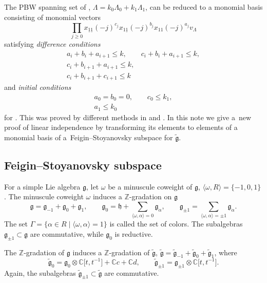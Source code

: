 \documentclass[pdftex]{sigma}
\newcommand{\Z}
{{\mathbb Z}}
\newcommand{\g}
{{\mathfrak g}}
\newcommand{\gt}
{\tilde{{\mathfrak g}}}
\numberwithin{equation}{section}
\begin{document}
The PBW spanning set of ,
$\Lambda = k_0 \Lambda_0 + k_1 \Lambda_1$,
 can be reduced to a monomial basis consisting of monomial vectors
\begin{equation} \label{upi}
	\prod_{j\geq 0} x_{\underline{1}\underline{1}}(-j)^{c_j} x_{1 \underline{1}}(-j)^{b_j} x_{11} (-j)^{a_j} v_\Lambda
\end{equation}
satisfying {\em difference conditions}
\begin{gather}
	\label{DCA1} 	
	a_i +b_i+a_{i+1}\leq k ,	\qquad
	c_i +b_i+a_{i+1}\leq k 	,\\
	\label{DCA1.5} c_i +b_{i+1}+a_{i+1}\leq k ,	\\
	\label{DCA2}	c_i +b_{i+1}+c_{i+1}\leq k 	
\end{gather}
and {\em initial conditions}
\begin{gather}
a_0=b_0  = 0,\qquad
	c_0 \leq k_1	,\label{ICA1} \\
a_1 \leq k_0	\label{ICA2}
\end{gather}
for .
%
 This was proved by different methods in \cite{MP} and \cite{FKLMM}. In this note we give a~new proof of linear independence by transforming its elements to elements of a monomial basis of a~Feigin--Stoyanovsky subspace for $\gt$.




\subsection{Feigin--Stoyanovsky subspace}

For a simple Lie algebra $\g$, let $\omega$ be a minuscule coweight of $\g$, $\langle \omega, R\rangle = \{-1,0,1\}$. The minuscule coweight $\omega$ induces a $\Z$-gradation on $\g$
\[
\mathfrak g =\mathfrak g_{-1} + \mathfrak g_0 + \mathfrak g_1 , \qquad
{\mathfrak g}_0 = {\mathfrak h} +
\sum_{\langle\omega,\alpha\rangle=0}  {\mathfrak g}_\alpha,
\qquad
\displaystyle {\mathfrak g}_{\pm1} =
\sum_{\langle\omega,\alpha\rangle= \pm 1}  {\mathfrak g}_\alpha.
\]
The set
$
	\Gamma =
	\{ \alpha \in R \mid \langle\omega,\alpha\rangle = 1\}
$
is called the set of colors.
The subalgebras ${\mathfrak g}_{\pm1}\subset\mathfrak g$ are commutative, while $\g_0$ is reductive.

The $\Z$-gradation of $\g$ induces a $\Z$-gradation of $\gt$,
$
\gt =\gt_{-1} + \gt_0 + \gt_1$,
where
\[
\gt_0 = \g_0 \otimes \mathbb{C}\bigl[t,t^{-1}\bigr] + \mathbb{C}c + \mathbb{C} d,\qquad
\gt_{\pm 1} = \g_{\pm 1} \otimes \mathbb{C}\bigl[t,t^{-1}\bigr].\]
Again, the subalgebras $\gt_{\pm1}\subset\gt$ are commutative.
\end{document}
